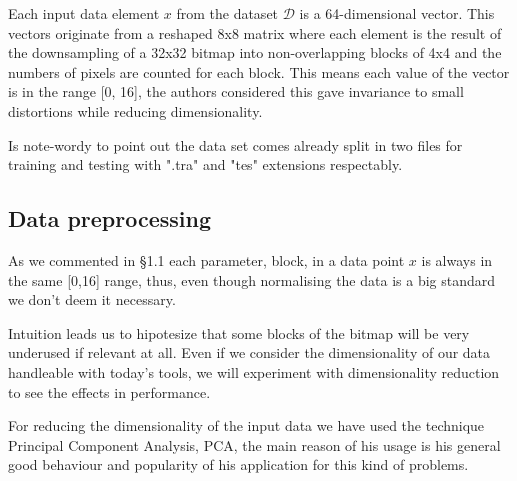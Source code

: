 \documentclass{article}
\begin{document}
Each input data element $x$ from the dataset $\mathcal{D}$ is a 64-dimensional vector. This vectors originate from a reshaped 8x8 matrix where each element is the result of the downsampling of a 32x32 bitmap into non-overlapping blocks of 4x4 and the numbers of pixels are counted for each block. This means each value of the vector is in the range [0, 16], the authors considered this gave invariance to small distortions while reducing dimensionality.

Is note-wordy to point out the data set comes already split in two files for training and testing with ".tra" and "tes" extensions respectably.








\subsection{Data preprocessing} 
As we commented in \S1.1 each parameter, block, in a data point $x$ is always in the same [0,16] range, thus, even though normalising the data is a big standard we don't deem it necessary.

Intuition leads us to hipotesize that some blocks of the bitmap will be very underused if relevant at all. Even if we consider the dimensionality of our data handleable with today's tools, we will experiment with dimensionality reduction to see the effects in performance.

For reducing the dimensionality of the input data we have used the technique Principal Component Analysis, PCA, the main reason of his usage is his general good behaviour and popularity of his application for this kind of problems.
\end{document}
